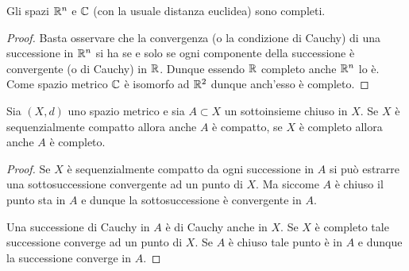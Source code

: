 \begin{corollary}[completezza di $\RR^n$ e $\CC$]
Gli spazi $\RR^n$ e $\CC$ (con la usuale distanza euclidea)
sono completi.
\end{corollary}
%
\begin{proof}
Basta osservare che la convergenza (o la condizione di Cauchy) di una successione in $\RR^n$
si ha se e solo se ogni componente della successione è convergente (o di Cauchy) in ${\mathbb R}$. 
Dunque essendo ${\mathbb R}$ completo anche $\RR^n$ lo è. 
Come spazio metrico $\CC$ è isomorfo ad ${\mathbb R}^2$ dunque anch'esso è completo.
\end{proof}


\begin{theorem}%
\label{th:chiuso_compatto_completo}%
Sia $(X,d)$ uno spazio metrico e sia $A\subset X$ un sottoinsieme chiuso in $X$. 
Se $X$ è sequenzialmente compatto allora anche $A$ è compatto, 
se $X$ è completo allora anche $A$ è completo.
\end{theorem}
%
\begin{proof}
Se $X$ è sequenzialmente compatto da ogni successione in $A$ 
si può estrarre una sottosuccessione convergente ad un punto di $X$. 
Ma siccome $A$ è chiuso il punto sta in $A$ e dunque la sottosuccessione è convergente in $A$.

Una successione di Cauchy in $A$ è di Cauchy anche in $X$. 
Se $X$ è completo tale successione converge ad un punto di $X$. 
Se $A$ è chiuso tale punto è in $A$ e dunque la successione converge in $A$.
\end{proof}

